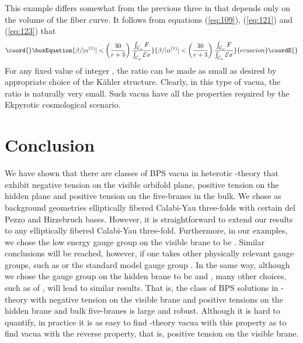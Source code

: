 \documentclass[a4paper,12pt]{article}
\numberwithin{equation}{section}
\theoremstyle{plain}
\begin{document}
This example differs somewhat from the previous three in that \myHighlight{$\beta$}\coordHE{} depends
only on the volume of the fiber curve. It follows from equations (\ref{eq:109}),
(\ref{eq:121}) and (\ref{eq:123}) that
%
\begin{equation}\coord{}\boxEquation{
\beta/|\alpha^{(1)}| < \left(\frac{30}{r+3}\right) \frac{\int_{{\cal{C}}_{\omega}}{F}}
{\int_{{\cal{C}}_{\omega}}{{\cal{E}}\sigma}}
\label{eq:130}
}{
\beta/|\alpha^{(1)}| < \left(\frac{30}{r+3}\right) \frac{\int_{{\cal{C}}_{\omega}}{F}}
{\int_{{\cal{C}}_{\omega}}{{\cal{E}}\sigma}}
}{ecuacion}\coordE{}\end{equation}
%
For any fixed value of integer \coordHE{}, the \coordHE{} 
ratio can be made as small as desired by appropriate choice of the K\"{a}hler
structure. Clearly, in this type of vacua, the \coordHE{} ratio 
is naturally very small. Such vacua have all the properties required by 
the Ekpyrotic cosmological scenario.

\section{Conclusion}

We have shown that there are classes of BPS vacua in
heterotic \coordHE{}-theory that exhibit negative tension on the visible orbifold
plane, positive tension on the hidden plane and positive tension on the
five-branes in the bulk. We chose as background geometries 
elliptically fibered Calabi-Yau three-folds with certain del Pezzo and 
Hirzebruch bases. However, it is straightforward to extend our results to any 
elliptically fibered Calabi-Yau three-fold. Furthermore, in our examples,
we chose the low energy gauge group on the visible brane to be
\coordHE{}. Similar conclusions will be reached, however, if one takes
other physically relevant gauge groups, such as \coordHE{} or the
standard model gauge group \coordHE{}.
In the same way, although we chose the gauge group on the hidden
brane to be \coordHE{} and \coordHE{}, many other choices, such as of
\coordHE{}, will lead to similar results. That is, the class of 
BPS solutions in \coordHE{}-theory with
negative tension on the visible brane and positive tensions on the hidden
brane and bulk five-branes is large and robust. Although it is hard to
quantify, in practice it is as easy to find \coordHE{}-theory vacua with this property as
to find vacua with the reverse property, that is,  positive tension on the visible
brane.
\end{document}
